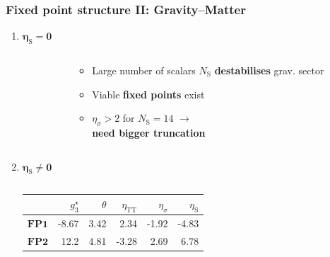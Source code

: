 \documentclass[]{beamer}  %
\newcommand\TTspace{ 0pt }
\newcommand\NS{ N_{\scriptscriptstyle{\mathrm{S}}} }
\newcommand\etaS{ \eta_{\scriptscriptstyle{\mathrm{S}}} }
\newcommand\etaTT{ \eta_{\scriptscriptstyle{\mathrm{T\hspace{\TTspace}T}}} }
\newcommand{\FPone}  {\textbf{FP1}}
\newcommand{\FPtwo}  {\textbf{FP2}}
\begin{document}
\begin{frame}
  \frametitle{Fixed point structure II: Gravity--Matter}

  \begin{enumerate}

      \vspace{5pt}
    \item
      $\mathbf{\boxed{\etaS = 0}}$

      \vspace{2pt}
      \begin{columns}[T]
        \begin{column}{.8\textwidth}
          
        \end{column}

        \hspace{-80pt}
        \begin{column}{.4\textwidth}
          \vspace{20pt}
          \begin{center}
            \begin{itemize}
            \item
              Large number of scalars $\NS$ \textbf{destabilises} grav. sector
            \item
              Viable \textbf{fixed points} exist
            \item
              $\eta_\sigma > 2$ for $\NS=14$ $\rightarrow$\\ \textbf{need bigger truncation}
          \end{itemize}
          \end{center}
        \end{column}
      \end{columns}

      \vspace{7pt}
    \item
      $\mathbf{\boxed{\etaS \neq 0}}$

      \vspace{-10pt}
      \begin{columns}[T]
        \begin{column}{.6\textwidth}
          \begin{center}
            \renewcommand{\arraystretch}{1.5}
            \begin{tabular}{ r r r r r r }
              & $g_{3}^\star$ & $\theta$ & $\etaTT$        & $\eta_{\sigma}$ & $\etaS$ \\
              \hline
              $\FPone$    & -8.67          & 3.42     & 2.34            & -1.92           & -4.83   \\
              $\FPtwo$    & 12.2           & 4.81     & -3.28           & 2.69            & 6.78    \\
            \end{tabular}
          \end{center}
        \end{column}


\end{columns}
\end{enumerate}
\end{frame}
\end{document}
